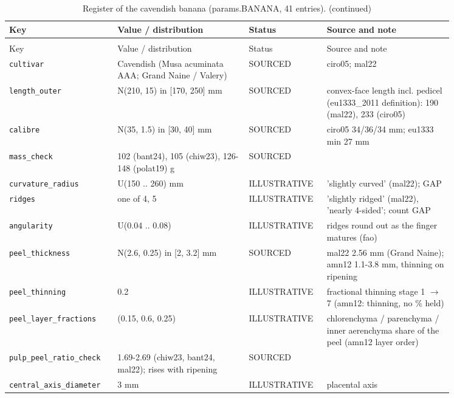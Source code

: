 \documentclass[10.5pt,a4paper]{article}
\begin{document}
{\scriptsize\begin{longtable}{@{}p{0.2\linewidth}p{0.27\linewidth}p{0.12\linewidth}p{0.26\linewidth}@{}}\caption{Register of the cavendish banana (params.BANANA, 41 entries).}\\\toprule Key & Value / distribution & Status & Source and note \\\midrule\endfirsthead
\caption[]{Register of the cavendish banana (params.BANANA, 41 entries). (continued)}\\\toprule Key & Value / distribution & Status & Source and note \\\midrule\endhead
\texttt{cultivar} & Cavendish (Musa acuminata AAA; Grand Naine / Valery) & SOURCED & ciro05; mal22 \\
\texttt{length\_\allowbreak{}outer} & N(210, 15) in [170, 250] mm & SOURCED & convex-face length incl. pedicel (eu1333\_2011 definition): 190 (mal22), 233 (ciro05) \\
\texttt{calibre} & N(35, 1.5) in [30, 40] mm & SOURCED & ciro05 34/36/34 mm; eu1333 min 27 mm \\
\texttt{mass\_\allowbreak{}check} & 102 (bant24), 105 (chiw23), 126-148 (polat19) g & SOURCED &  \\
\texttt{curvature\_\allowbreak{}radius} & U(150 .. 260) mm & ILLUSTRATIVE & 'slightly curved' (mal22); GAP \\
\texttt{ridges} & one of 4, 5 & ILLUSTRATIVE & 'slightly ridged' (mal22), 'nearly 4-sided'; count GAP \\
\texttt{angularity} & U(0.04 .. 0.08) & ILLUSTRATIVE & ridges round out as the finger matures (fao) \\
\texttt{peel\_\allowbreak{}thickness} & N(2.6, 0.25) in [2, 3.2] mm & SOURCED & mal22 2.56 mm (Grand Naine); amn12 1.1-3.8 mm, thinning on ripening \\
\texttt{peel\_\allowbreak{}thinning} & 0.2 & ILLUSTRATIVE & fractional thinning stage 1 $\to$ 7 (amn12: thinning, no \% held) \\
\texttt{peel\_\allowbreak{}layer\_\allowbreak{}fractions} & (0.15, 0.6, 0.25) & ILLUSTRATIVE & chlorenchyma / parenchyma / inner aerenchyma share of the peel (amn12 layer order) \\
\texttt{pulp\_\allowbreak{}peel\_\allowbreak{}ratio\_\allowbreak{}check} & 1.69-2.69 (chiw23, bant24, mal22); rises with ripening & SOURCED &  \\
\texttt{central\_\allowbreak{}axis\_\allowbreak{}diameter} & 3 mm & ILLUSTRATIVE & placental axis \\

\end{longtable}}
\end{document}
